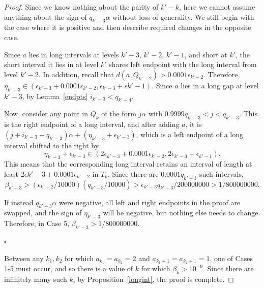 \documentclass[11pt,reqno]{amsart}
\theoremstyle{definition}
\theoremstyle{plain}
\begin{document}
\begin{proof}
Since we know nothing about the parity of $k' - k$, here we cannot assume anything about the sign of $q_{k' - 3} \alpha$ without loss of generality. We still begin with the case where it is positive and then describe required changes in the opposite case.

Since $a$ lies in long intervals at levels $k'-3$, $k'-2$, $k'-1$, and short at $k'$, the short interval it lies in at level $k'$ shares left endpoint with the long interval from level $k'-2$. In addition, recall that $d(a, Q_{k'-2}) > 0.0001 \epsilon_{k'-2}$. Therefore, $\eta_{k'-3} \in (\epsilon_{k'-3} + 0.0001 \epsilon_{k'-2}, \epsilon_{k'-3} + \epsilon{k'-1})$. Since $a$ lies in a long gap at level $k'-3$, by Lemma~\ref{endpts} $i_{k'-3} < q_{k'-4}$. 


Now, consider any point in $Q_k$ of the form $j \alpha$ with $0.9999 q_{k'-3} < j < q_{k'-3}$. This is the right endpoint of a long interval, and after adding $a$, it is $(j + i_{k'-3} - q_{k'-3})\alpha + (\eta_{k'-3} + \epsilon_{k'-3})$, which is a left endpoint of a long interval shifted to the right by 
\[
\eta_{k'-3} + \epsilon_{k'-3} \in (2 \epsilon_{k'-3} + 0.0001\epsilon_{k'-2}, 2\epsilon_{k'-3} + \epsilon_{k'-1}).
\] 
This means that the corresponding long interval retains an interval of length at least $2\epsilon{k'-3} + 0.0001 \epsilon_{k'-2}$ in $T_k$. Since there are $0.0001 q_{k'-3}$ such intervals,
\[
\beta_{k'-3} > (\epsilon_{k'-2}/10000)(q_{k'-3}/10000) > \epsilon_{k'-3}q_{k'-3}/200000000 > 1/800000000.
\]

If instead $q_{k'-3} \alpha$ were negative, all left and right endpoints in the proof are swapped, and the sign of $\eta_{k'-3}$ will be negative, but nothing else needs to change. Therefore, in Case 5, $\beta_{k'-3} > 1/800000000$.
\begin{flushright}
    $\square$\\
\end{flushright}

Between any $k_1, k_2$ for which $a_{k_1} = a_{k_2} = 2$ and $a_{k_1 + 1} = a_{k_2 + 1} = 1$, one of Cases 1-5 must occur, and so there is a value of $k$ for which $\beta_k > 10^{-9}$. Since there are infinitely many such $k$, by Proposition~\ref{longint}, the proof is complete.

\end{proof}
\end{document}
